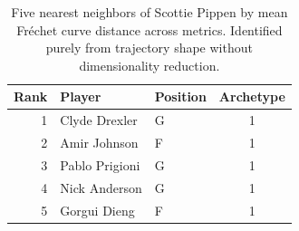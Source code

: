 \begin{table}[htbp]
  \centering\small
  \begin{tabular}{rllc}
    \toprule
    Rank & Player & Position & Archetype \\
    \midrule
    1 & Clyde Drexler & G & 1 \\
    2 & Amir Johnson & F & 1 \\
    3 & Pablo Prigioni & G & 1 \\
    4 & Nick Anderson & G & 1 \\
    5 & Gorgui Dieng & F & 1 \\
    \bottomrule
  \end{tabular}
  \caption{Five nearest neighbors of Scottie Pippen by mean Fr\'{e}chet curve distance across metrics. Identified purely from trajectory shape without dimensionality reduction.}
  \label{tab:Scottie_Pippen_frechet_curve_neighbors}
\end{table}

